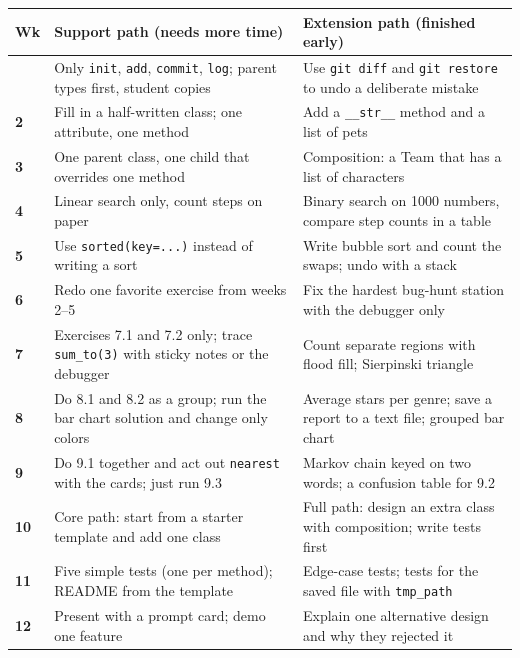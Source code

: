 \documentclass[level=3,teacher]{kidscode}
\begin{document}
\begin{longtable}{@{}>{\bfseries}p{0.8cm}>{\raggedright\arraybackslash}p{7cm}>{\raggedright\arraybackslash}p{\dimexpr\linewidth-7.8cm-4\tabcolsep}@{}}
\toprule
\rowcolor{kcaccent!15} Wk & Support path (needs more time) & Extension path (finished early)\\ \midrule\endhead
\bottomrule\endfoot
1 & Only \texttt{init}, \texttt{add}, \texttt{commit}, \texttt{log}; parent types first, student copies & Use \texttt{git diff} and \texttt{git restore} to undo a deliberate mistake\\ \midrule
2 & Fill in a half-written class; one attribute, one method & Add a \texttt{\_\_str\_\_} method and a list of pets\\ \midrule
3 & One parent class, one child that overrides one method & Composition: a Team that has a list of characters\\ \midrule
4 & Linear search only, count steps on paper & Binary search on 1000 numbers, compare step counts in a table\\ \midrule
5 & Use \texttt{sorted(key=...)} instead of writing a sort & Write bubble sort and count the swaps; undo with a stack\\ \midrule
6 & Redo one favorite exercise from weeks 2--5 & Fix the hardest bug-hunt station with the debugger only\\ \midrule
7 & Exercises 7.1 and 7.2 only; trace \texttt{sum\_to(3)} with sticky notes or the debugger & Count separate regions with flood fill; Sierpinski triangle\\ \midrule
8 & Do 8.1 and 8.2 as a group; run the bar chart solution and change only colors & Average stars per genre; save a report to a text file; grouped bar chart\\ \midrule
9 & Do 9.1 together and act out \texttt{nearest} with the cards; just run 9.3 & Markov chain keyed on two words; a confusion table for 9.2\\ \midrule
10 & Core path: start from a starter template and add one class & Full path: design an extra class with composition; write tests first\\ \midrule
11 & Five simple tests (one per method); README from the template & Edge-case tests; tests for the saved file with \texttt{tmp\_path}\\ \midrule
12 & Present with a prompt card; demo one feature & Explain one alternative design and why they rejected it\\
\end{longtable}
\end{document}
